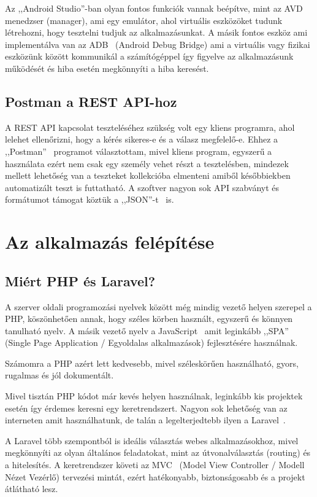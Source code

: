 \documentclass[
]{thesis-ekf}
\theoremstyle{definition}
\theoremstyle{remark}
\begin{document}
	Az ,,Android Studio''-ban olyan fontos funkciók vannak beépítve, mint az AVD~\cite{androidStudioAvd_doc} menedzser (manager), ami egy emulátor, ahol virtuális eszközöket tudunk létrehozni, hogy tesztelni tudjuk az alkalmazásunkat. A másik fontos eszköz ami implementálva van az ADB~\cite{androidStudioAdb_doc} (Android Debug Bridge) ami a virtuális vagy fizikai eszközünk között kommunikál a számítógéppel így figyelve az alkalmazásunk működését és hiba esetén megkönnyíti a hiba keresést. 
	
	\section{Postman a REST API-hoz}
	A REST API kapcsolat teszteléséhez szükség volt egy kliens programra, ahol lelehet ellenőrizni, hogy a kérés sikeres-e és a válasz megfelelő-e. Ehhez a ,,Postman''~\cite{postman_doc} programot választottam, mivel kliens program, egyszerű a használata ezért nem csak egy személy vehet részt a tesztelésben, mindezek mellett lehetőség van a teszteket kollekcióba elmenteni amiből későbbiekben automatizált teszt is futtatható. A szoftver nagyon sok API szabványt és formátumot támogat köztük a ,,JSON''-t~\cite{json_doc} is.
	
	\chapter{Az alkalmazás felépítése}
	\section{Miért PHP és Laravel?}
	A szerver oldali programozási nyelvek között még mindig vezető helyen szerepel a PHP, köszönhetően annak, hogy széles körben használt, egyszerű és könnyen tanulható nyelv. A másik vezető nyelv a JavaScript~\cite{js_book} amit leginkább ,,SPA'' (Single Page Application / Egyoldalas alkalmazások) fejlesztésére használnak. 
	
	Számomra a PHP azért lett kedvesebb, mivel széleskörűen használható, gyors, rugalmas és jól dokumentált. 
	
	Mivel tisztán PHP kódot már kevés helyen használnak, leginkább kis projektek esetén így érdemes keresni egy keretrendszert. Nagyon sok lehetőség van az interneten amit használhatunk, de talán a legelterjedtebb ilyen a Laravel~\cite{laravel_book}. 
	
	A Laravel több szempontból is ideális választás webes alkalmazásokhoz, mivel megkönnyíti az olyan általános feladatokat, mint az útvonalválasztás (routing) és a hitelesítés. A keretrendszer követi az MVC~\cite{mvc_pattern} (Model View Controller / Modell Nézet Vezérlő) tervezési mintát, ezért hatékonyabb, biztonságosabb és a projekt átlátható lesz. 
	
\end{document}
